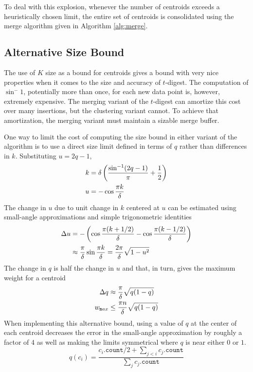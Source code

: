 \documentclass[11pt]{amsart}
\begin{document}
To deal with this explosion, whenever the number of centroids exceeds a heuristically chosen limit, the entire set of centroids is consolidated using the merge algorithm given in Algorithm \ref{alg:merge}.  

\subsection{Alternative Size Bound}
The use of $K$ size as a bound for centroids gives a bound with very nice properties when it comes to the size and accuracy of $t$-digest. The computation of $\sin^-1$, potentially more than once, for each new data point is, however, extremely expensive. The merging variant of the $t$-digest can amortize this cost over many insertions, but the clustering variant cannot. To achieve that amortization, the merging variant must maintain a sizable merge buffer.

One way to limit the cost of computing the size bound in either variant of the algorithm is to use a direct size limit defined in terms of $q$ rather than differences in $k$. Substituting $u=2q-1$,
\[
\begin{aligned}
k &= \delta \left( {\sin^{-1}(2q-1) \over \pi} + {1 \over 2} \right ) \\
u &= - \cos {\pi k \over \delta} \\
\end{aligned}
\]
The change in $u$ due to unit change in $k$ centered at $u$ can be estimated using small-angle approximations and simple trigonometric identities
\[
\begin{aligned}
\Delta u &= -\left( \cos {\pi (k+1/2) \over \delta} - \cos {\pi (k-1/2) \over \delta} \right) \\
 &\approx    {\pi \over \delta}\sin {\pi k \over \delta}    =    {2\pi \over \delta} \sqrt {1-u^2} \\
\end{aligned}
\]
The change in $q$ is half the change in $u$ and that, in turn, gives the maximum weight for a centroid
\[
\begin{aligned}
 \Delta q &\approx { \pi \over \delta} \sqrt {q (1-q)}   \\
w_{\mathtt max} &\le  { \pi n \over \delta} \sqrt {q (1-q)}   
\end{aligned}
\]
When implementing this alternative bound, using a value of $q$ at the center of each centroid decreases the error in the small-angle approximation by roughly a factor of 4 as well as making the limits symmetrical where $q$ is near either $0$ or $1$.
\[q(c_i)=\frac{c_i.\mathtt{count}/2 + \sum_{j<i}c_j.\mathtt{count}} {\sum_j c_j.\mathtt{count}}\]
\end{document}
